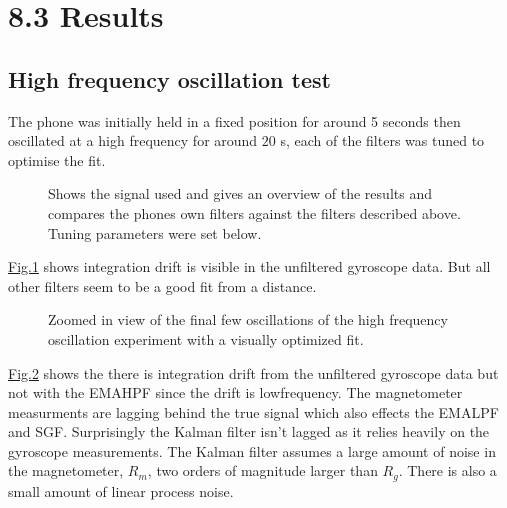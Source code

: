 \documentclass[letterpaper,10pt,english]{jupyterBook}
\begin{document}
\section{8.3 Results}
\label{\detokenize{8TestingFilters:results}}

\subsection{High frequency oscillation test}
\label{\detokenize{8TestingFilters:high-frequency-oscillation-test}}
\sphinxAtStartPar
The phone was initially held in a fixed position for around 5 seconds then oscillated at a high frequency for around \(20\) s, each of the filters was tuned to optimise the fit.

\begin{figure}[htbp]
\centering
\capstart

\noindent{}
\caption{Shows the signal used and gives an overview of the results and compares the phones own filters against the filters described above. Tuning parameters were set below.}\label{\detokenize{8TestingFilters:high-freq-oscillation}}\end{figure}

\sphinxAtStartPar
\hyperref[\detokenize{8TestingFilters:high-freq-oscillation}]{Fig.\@ \ref{\detokenize{8TestingFilters:high-freq-oscillation}}} shows integration drift is visible in the unfiltered gyroscope data. But all other filters seem to be a good fit from a distance.

\begin{figure}[htbp]
\centering
\capstart

\noindent{}
\caption{Zoomed in view of the final few oscillations of the high frequency oscillation experiment with a visually optimized fit.}\label{\detokenize{8TestingFilters:high-freq-oscillation-zoomed}}\end{figure}

\sphinxAtStartPar
\hyperref[\detokenize{8TestingFilters:high-freq-oscillation-zoomed}]{Fig.\@ \ref{\detokenize{8TestingFilters:high-freq-oscillation-zoomed}}} shows the there is integration drift from the unfiltered gyroscope data but not with the EMAHPF since the drift is low\sphinxhyphen{}frequency. The magnetometer measurments are lagging behind the true signal which also effects the EMALPF and SGF. Surprisingly the Kalman filter isn’t lagged as it relies heavily on the gyroscope measurements. The Kalman filter assumes a large amount of noise in the magnetometer, \(R_m\), two orders of magnitude larger than \(R_g\). There is also a small amount of linear process noise.
\end{document}
